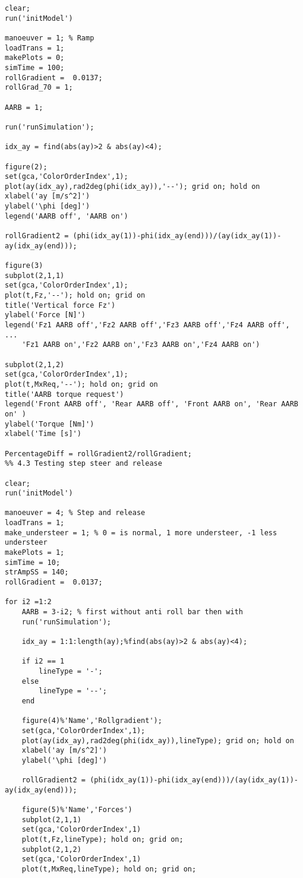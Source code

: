 \begin{lstlisting}
clear;
run('initModel')

manoeuver = 1; % Ramp
loadTrans = 1;
makePlots = 0;
simTime = 100;
rollGradient =  0.0137;
rollGrad_70 = 1;

AARB = 1;

run('runSimulation');

idx_ay = find(abs(ay)>2 & abs(ay)<4);

figure(2);
set(gca,'ColorOrderIndex',1);
plot(ay(idx_ay),rad2deg(phi(idx_ay)),'--'); grid on; hold on
xlabel('ay [m/s^2]')
ylabel('\phi [deg]')
legend('AARB off', 'AARB on')

rollGradient2 = (phi(idx_ay(1))-phi(idx_ay(end)))/(ay(idx_ay(1))-ay(idx_ay(end)));

figure(3)
subplot(2,1,1)
set(gca,'ColorOrderIndex',1);
plot(t,Fz,'--'); hold on; grid on 
title('Vertical force Fz')
ylabel('Force [N]')
legend('Fz1 AARB off','Fz2 AARB off','Fz3 AARB off','Fz4 AARB off', ... 
    'Fz1 AARB on','Fz2 AARB on','Fz3 AARB on','Fz4 AARB on')

subplot(2,1,2)
set(gca,'ColorOrderIndex',1);
plot(t,MxReq,'--'); hold on; grid on
title('AARB torque request')
legend('Front AARB off', 'Rear AARB off', 'Front AARB on', 'Rear AARB on' )
ylabel('Torque [Nm]')
xlabel('Time [s]')

PercentageDiff = rollGradient2/rollGradient;
%% 4.3 Testing step steer and release 

clear;
run('initModel')

manoeuver = 4; % Step and release
loadTrans = 1;
make_understeer = 1; % 0 = is normal, 1 more understeer, -1 less understeer
makePlots = 1;
simTime = 10;
strAmpSS = 140;
rollGradient =  0.0137;

for i2 =1:2
    AARB = 3-i2; % first without anti roll bar then with
    run('runSimulation');
    
    idx_ay = 1:1:length(ay);%find(abs(ay)>2 & abs(ay)<4);

    if i2 == 1
        lineType = '-';
    else
        lineType = '--';
    end

    figure(4)%'Name','Rollgradient');
    set(gca,'ColorOrderIndex',1);
    plot(ay(idx_ay),rad2deg(phi(idx_ay)),lineType); grid on; hold on
    xlabel('ay [m/s^2]')
    ylabel('\phi [deg]')
    
    rollGradient2 = (phi(idx_ay(1))-phi(idx_ay(end)))/(ay(idx_ay(1))-ay(idx_ay(end)));
    
    figure(5)%'Name','Forces')
    subplot(2,1,1)
    set(gca,'ColorOrderIndex',1)
    plot(t,Fz,lineType); hold on; grid on;
    subplot(2,1,2)
    set(gca,'ColorOrderIndex',1)
    plot(t,MxReq,lineType); hold on; grid on;
    

\end{lstlisting}
